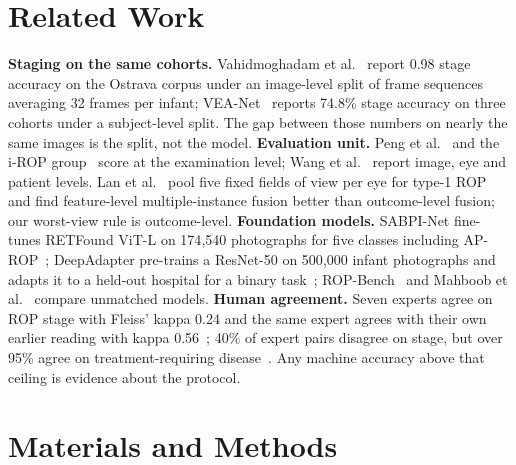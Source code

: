 \documentclass[conference]{IEEEtran}
\begin{document}
\section{Related Work}
\textbf{Staging on the same cohorts.} Vahidmoghadam et al.~\cite{vahid2026} report 0.98 stage accuracy on the Ostrava corpus under an image-level split of frame sequences averaging 32 frames per infant; VEA-Net~\cite{wang2026} reports 74.8\% stage accuracy on three cohorts under a subject-level split. The gap between those numbers on nearly the same images is the split, not the model. \textbf{Evaluation unit.} Peng et al.~\cite{peng2021} and the i-ROP group~\cite{brown2018,derks2025} score at the examination level; Wang et al.~\cite{wang2021} report image, eye and patient levels. Lan et al.~\cite{lan2026} pool five fixed fields of view per eye for type-1 ROP and find feature-level multiple-instance fusion better than outcome-level fusion; our worst-view rule is outcome-level. \textbf{Foundation models.} SABPI-Net fine-tunes RETFound ViT-L on 174{,}540 photographs for five classes including AP-ROP~\cite{chen2025}; DeepAdapter pre-trains a ResNet-50 on 500{,}000 infant photographs and adapts it to a held-out hospital for a binary task~\cite{zhao2026}; ROP-Bench~\cite{luo2026} and Mahboob et al.~\cite{mahboob2025} compare unmatched models. \textbf{Human agreement.} Seven experts agree on ROP stage with Fleiss' kappa 0.24 and the same expert agrees with their own earlier reading with kappa 0.56~\cite{gschliesser2015}; 40\% of expert pairs disagree on stage, but over 95\% agree on treatment-requiring disease~\cite{campbell2016}. Any machine accuracy above that ceiling is evidence about the protocol.

\section{Materials and Methods}
\end{document}
